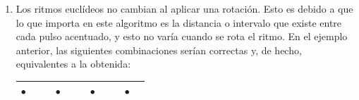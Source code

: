 \documentclass[a4paper, openright, 11pt, titlepage]{report}
\theoremstyle{definition}\newtheorem{defin}[propo]{Definition}
\theoremstyle{definition}\newtheorem{obser}[propo]{Remark}
\theoremstyle{definition}\newtheorem{ejem}[propo]{Ejemplo}
\theoremstyle{definition}\newtheorem{algoritmo}[propo]{Algoritmo}
\begin{document}
\begin{enumerate}
    \item Los ritmos euclídeos no cambian al aplicar una rotación. Esto es debido a que lo que importa en este algoritmo es la distancia o intervalo que existe entre cada pulso acentuado, y esto no varía cuando se rota el ritmo. En el ejemplo anterior, las siguientes combinaciones serían correctas y, de hecho, equivalentes a la obtenida:
    \begin{table}[H]
        \centering
        \begin{tabular}{|c|c|c|c|c|c|c|c|c|c|c|}
        \hline
            $\bullet$ & & & $\bullet$ & & & $\bullet$ & & &$\bullet$ &\\
            \hline
        \end{tabular}
        \end{table}


\end{enumerate}
\end{document}
